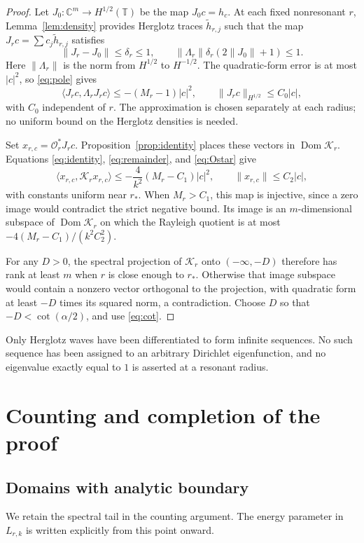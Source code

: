 \documentclass[11pt]{amsart}
\numberwithin{equation}{section}
\newcommand{\T}{\mathbb T}
\newcommand{\Dom}{\operatorname{Dom}}
\newcommand{\ip}[2]{\langle #1,#2\rangle}
\newcommand{\norm}[1]{\lVert #1\rVert}
\newcommand{\OO}{\mathcal O}
\newcommand{\KK}{\mathcal K}
\begin{document}
\begin{proof}
Let $J_0:\mathbb C^m\to H^{1/2}(\T)$ be the map $J_0c=h_c$.
At each fixed nonresonant $r$, Lemma~\ref{lem:density} provides
Herglotz traces $\widetilde h_{r,j}$ such that the map
$J_rc=\sum c_j\widetilde h_{r,j}$ satisfies
\[
 \norm{J_r-J_0}\le\delta_r\le1,\qquad
 \norm{\Lambda_r}\delta_r(2\norm{J_0}+1)\le1.
\]
Here $\norm{\Lambda_r}$ is the norm from $H^{1/2}$ to $H^{-1/2}$.
The quadratic-form error is at most $|c|^2$, so \eqref{eq:pole}
gives
\[
 \ip{J_rc}{\Lambda_rJ_rc}\le-(M_r-1)|c|^2,
 \qquad \norm{J_rc}_{H^{1/2}}\le C_0|c|,
\]
with $C_0$ independent of $r$. The approximation is chosen separately
at each radius; no uniform bound on the Herglotz densities is needed.

Set $x_{r,c}=\OO_r^*J_rc$. Proposition~\ref{prop:identity} places
these vectors in $\Dom\KK_r$. Equations \eqref{eq:identity},
\eqref{eq:remainder}, and \eqref{eq:Ostar} give
\[
 \ip{x_{r,c}}{\KK_rx_{r,c}}
       \le-\frac4{k^2}(M_r-C_1)|c|^2,
 \qquad \norm{x_{r,c}}\le C_2|c|,
\]
with constants uniform near $r_*$. When $M_r>C_1$, this map is
injective, since a zero image would contradict the strict negative
bound. Its image is an $m$-dimensional subspace of $\Dom\KK_r$
on which the Rayleigh quotient is at most
$-4(M_r-C_1)/(k^2C_2^2)$.

For any $D>0$, the spectral projection of $\KK_r$ onto
$(-\infty,-D)$ therefore has rank at least $m$ when $r$ is close
enough to $r_*$. Otherwise that image subspace would contain a
nonzero vector orthogonal to the projection, with quadratic form
at least $-D$ times its squared norm, a contradiction.
Choose $D$ so that $-D<\cot(\alpha/2)$, and use \eqref{eq:cot}.
\end{proof}

Only Herglotz waves have been differentiated to form infinite
sequences. No such sequence has been assigned to an arbitrary
Dirichlet eigenfunction, and no eigenvalue exactly equal to $1$
is asserted at a resonant radius.

\section{Counting and completion of the proof}\label{sec:completion}

\subsection{Domains with analytic boundary}
We retain the spectral tail in the counting argument. The energy
parameter in $L_{r,k}$ is written explicitly from this point onward.
\end{document}
